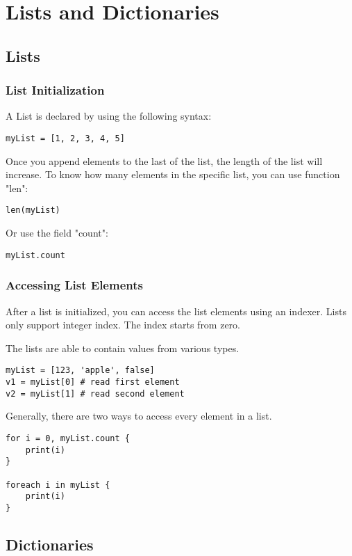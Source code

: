 \chapter{Lists and Dictionaries}
\section{Lists}
\subsection{List Initialization}
A List is declared by using the following syntax:

\begin{lstlisting}
myList = [1, 2, 3, 4, 5]
\end{lstlisting}

Once you append elements to the last of the list, the length of the list will increase. To know how many elements in the specific list, you can use function "len":

\begin{lstlisting}
len(myList)
\end{lstlisting}

Or use the field "count":

\begin{lstlisting}
myList.count
\end{lstlisting}

\subsection{Accessing List Elements}
After a list is initialized, you can access the list elements using an indexer. Lists only support integer index. The index starts from zero.

The lists are able to contain values from various types.

\begin{lstlisting}
myList = [123, 'apple', false]
v1 = myList[0] # read first element
v2 = myList[1] # read second element
\end{lstlisting}

Generally, there are two ways to access every element in a list.

\begin{lstlisting}
for i = 0, myList.count {
	print(i)
}

foreach i in myList {
	print(i)
}
\end{lstlisting}

\section{Dictionaries}
